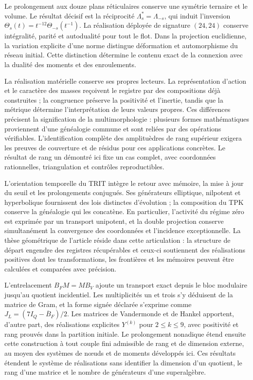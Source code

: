 \documentclass[a4paper,10pt]{article}
\theoremstyle{definition}\newtheorem{definition}[theorem]{Définition}
\theoremstyle{remark}\newtheorem{remark}[theorem]{Remarque}
\numberwithin{equation}{section}
\begin{document}
Le prolongement aux douze plans réticulaires conserve une symétrie
ternaire et le volume. Le résultat décisif est la réciprocité
\(\Lambda_s^*=\Lambda_{-s}\), qui induit l’inversion
\(\Theta_s(t)=t^{-12}\Theta_{-s}(t^{-1})\). La réalisation déployée de
signature \((24,24)\) conserve intégralité, parité et autodualité pour
tout le flot. Dans la projection euclidienne, la variation explicite d’une
norme distingue déformation et automorphisme du réseau initial. Cette
distinction détermine le contenu exact de la connexion avec la dualité
des moments et des enroulements.

La réalisation matérielle conserve ses propres lecteurs. La représentation d'action et le caractère des masses reçoivent le registre par des compositions déjà construites ; la congruence préserve la positivité et l'inertie, tandis que la métrique détermine l'interprétation de leurs valeurs propres. Ces différences précisent la signification de la multimorphologie : plusieurs formes mathématiques proviennent d'une généalogie commune et sont reliées par des opérations vérifiables. L'identification complète des amplituèdres de rang supérieur exigera les preuves de couverture et de résidus pour ces applications concrètes. Le résultat de rang un démontré ici fixe un cas complet, avec coordonnées rationnelles, triangulation et contrôles reproductibles.

L’orientation temporelle du TRIT intègre le retour avec mémoire, la
mise à jour du seuil et les prolongements conjugués. Ses générateurs
elliptique, nilpotent et hyperbolique fournissent des lois distinctes
d’évolution ; la composition du TPK conserve la généalogie qui les
concatène. En particulier, l’activité du régime zéro est exprimée
par un transport unipotent, et la double projection conserve simultanément
la convergence des coordonnées et l’incidence exceptionnelle. La thèse
géométrique de l’article réside dans cette articulation : la structure de
départ engendre des registres récupérables et ceux-ci soutiennent des réalisations
positives dont les transformations, les frontières et les mémoires peuvent être calculées
et comparées avec précision.

L’entrelacement \(B_FM=MB_V\) ajoute un transport exact depuis le
bloc modulaire jusqu’au quotient incidentiel. Les multiplicités
un et trois s’y déduisent de la matrice de Gram, et la forme signée déclarée
s’exprime comme \(J_L=(7I_Q-\overline B_F)/2\). Les matrices de
Vandermonde et de Hankel apportent, d’autre part, des réalisations explicites
\(Y^{(k)}\) pour \(2\le k\le9\), avec positivité et rang prouvés
dans la partition initiale. Le prolongement nonadique étend ensuite
cette construction à tout couple fini admissible de rang et de dimension
externe, au moyen des systèmes de nœuds et de moments développés ici.
Ces résultats étendent le système de réalisations sans identifier
la dimension d’un quotient, le rang d’une matrice et le nombre de
générateurs d’une superalgèbre.
\end{document}
